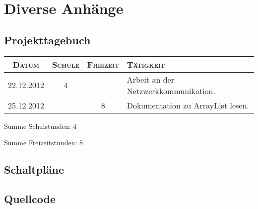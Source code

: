 

\chapter{Diverse Anhänge}


\section{Projekttagebuch}



\begin{longtable}[l]{|c|c|c|p{10cm}|}
\hline
{\scshape\bfseries Datum} & {\scshape\bfseries Schule} & {\scshape\bfseries Freizeit} & {\scshape\bfseries Tätigkeit} \\\hline\hline\endhead
22.12.2012 & 4 &  & Arbeit an der Netzwerkkommunikation.\\\hline
25.12.2012 &  & 8 & Dokumentation zu ArrayList lesen.\\\hline
\end{longtable}

Summe Schulstunden: 4\par
Summe Freizeitstunden: 8

\section{Schaltpläne}


\section{Quellcode}


